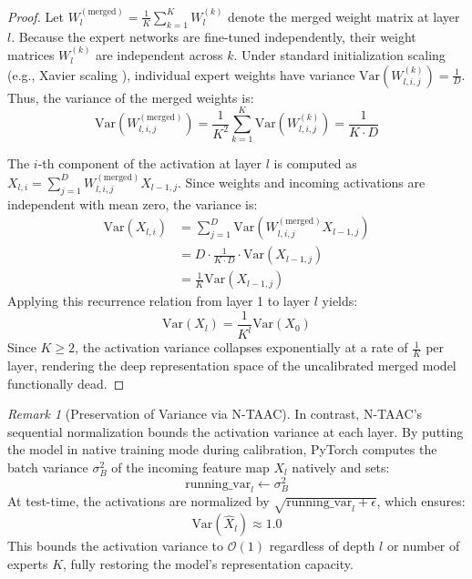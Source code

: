 \documentclass{article}
\theoremstyle{plain}
\theoremstyle{definition}
\theoremstyle{remark}
\newtheorem{remark}[theorem]{Remark}
\begin{document}
\begin{proof}
Let $W_l^{(\text{merged})} = \frac{1}{K} \sum_{k=1}^K W_l^{(k)}$ denote the merged weight matrix at layer $l$. Because the expert networks are fine-tuned independently, their weight matrices $W_l^{(k)}$ are independent across $k$. Under standard initialization scaling (e.g., Xavier scaling \cite{glorot2010understanding}), individual expert weights have variance $\text{Var}\left(W_{l, i, j}^{(k)}\right) = \frac{1}{D}$. Thus, the variance of the merged weights is:
\begin{equation}
\text{Var}(W_{l, i, j}^{(\text{merged})}) = \frac{1}{K^2} \sum_{k=1}^K \text{Var}(W_{l, i, j}^{(k)}) = \frac{1}{K \cdot D}
\end{equation}

The $i$-th component of the activation at layer $l$ is computed as $X_{l, i} = \sum_{j=1}^D W_{l, i, j}^{(\text{merged})} X_{l-1, j}$. Since weights and incoming activations are independent with mean zero, the variance is:
\begin{align}
\text{Var}(X_{l, i}) &= \sum_{j=1}^D \text{Var}\left(W_{l, i, j}^{(\text{merged})} X_{l-1, j}\right) \nonumber \\
&= D \cdot \frac{1}{K \cdot D} \cdot \text{Var}(X_{l-1, j}) \nonumber \\
&= \frac{1}{K} \text{Var}(X_{l-1, j})
\end{align}
Applying this recurrence relation from layer 1 to layer $l$ yields:
\begin{equation}
\text{Var}(X_l) = \frac{1}{K^l} \text{Var}(X_0)
\end{equation}
Since $K \ge 2$, the activation variance collapses exponentially at a rate of $\frac{1}{K}$ per layer, rendering the deep representation space of the uncalibrated merged model functionally dead.
\end{proof}

\begin{remark}[Preservation of Variance via N-TAAC]
In contrast, N-TAAC's sequential normalization bounds the activation variance at each layer. By putting the model in native training mode during calibration, PyTorch computes the batch variance $\sigma_B^2$ of the incoming feature map $X_l$ natively and sets:
\begin{equation}
\text{running\_var}_l \leftarrow \sigma_B^2
\end{equation}
At test-time, the activations are normalized by $\sqrt{\text{running\_var}_l + \epsilon}$, which ensures:
\begin{equation}
\text{Var}(\hat{X}_l) \approx 1.0
\end{equation}
This bounds the activation variance to $\mathcal{O}(1)$ regardless of depth $l$ or number of experts $K$, fully restoring the model's representation capacity.
\end{remark}
\end{document}

